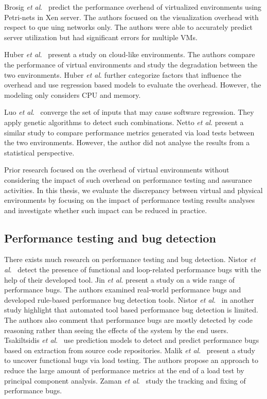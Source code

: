 Brosig \textit{et al$.$}~\cite{brosig2013evaluating} predict the performance overhead of virtualized environments using Petri-nets in Xen server. The authors focused on the visualization overhead with respect to que	uing networks only. The authors were able to accurately predict server utilization but had significant errors for multiple VMs.


Huber \textit{et al$.$}~\cite{huber2011evaluating} present a study on cloud-like environments. The authors compare the performance of virtual environments and study the degradation between the two environments. Huber \textit{et al$.$} further categorize factors that influence the overhead and use regression based models to evaluate the overhead. However, the modeling only considers CPU and memory.


Luo \textit{et al$.$}~\cite{Luo:2016:MPR:2901739.2901765} converge the set of inputs that may cause software regression. They apply genetic algorithms to detect such combinations. Netto \textit{et al$.$} \cite{netto2011evaluating} present a similar study to compare performance metrics generated via load tests between the two environments. However, the author did not analyse the results from a statistical perspective.

Prior research focused on the overhead of virtual environments without considering the impact of such overhead on performance testing and assurance activities. In this thesis, we evaluate the discrepancy between virtual and physical environments by focusing on the impact of performance testing results analyses and investigate whether such impact can be reduced in practice.


\subsection{Performance testing and bug detection}

There exists much research on performance testing and bug detection. Nistor \textit{et al$.$}~\cite{Nistor} detect the presence of functional and loop-related performance bugs with the help of their developed tool. Jin \textit{et al$.$} \cite{Jin} present a study on a wide range of performance bugs. The authors examined real-world performance bugs and developed rule-based performance bug detection tools. Nistor \textit{et al$.$}~\cite{nistor_2} in another study highlight that automated tool based performance bug detection is limited. The authors also comment that performance bugs are mostly detected by code reasoning rather than seeing the effects of the system by the end users. Tsakiltsidis \textit{et al$.$}~\cite{Tsakiltsidis} use prediction models to detect and predict performance bugs based on extraction from source code repositories. Malik \textit{et al$.$}~\cite{h_malik_p_bugs} present a study to uncover functional bugs via load testing. The authors propose an approach to reduce the large amount of performance metrics at the end of a load test by principal component analysis. Zaman \textit{et al$.$}~\cite{zaman_p_bugs} study the tracking and fixing of performance bugs.

